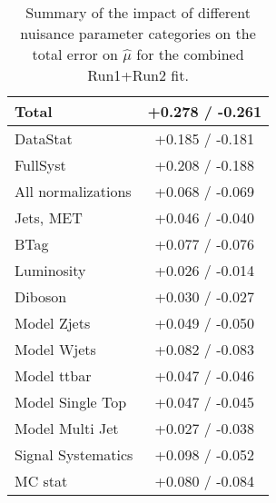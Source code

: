 \begin{table}[!htbp]\captionsetup{justification=centering}
\caption{Summary of the impact of different nuisance parameter categories on the total error on $\hat{\mu}$ for the combined Run1+Run2 fit.}
\begin{center}\begin{tabular}{|l|c|}
\hline
Total & +0.278 / -0.261 \\\hline
DataStat & +0.185 / -0.181 \\
FullSyst & +0.208 / -0.188 \\\hline
All normalizations & +0.068 / -0.069 \\
Jets, MET & +0.046 / -0.040 \\
BTag & +0.077 / -0.076 \\
Luminosity & +0.026 / -0.014 \\
Diboson &  +0.030 / -0.027 \\
Model Zjets & +0.049 / -0.050 \\
Model Wjets & +0.082 / -0.083 \\
Model ttbar & +0.047 / -0.046 \\
Model Single Top & +0.047 / -0.045 \\
Model Multi Jet & +0.027 / -0.038 \\
Signal Systematics & +0.098 / -0.052 \\
MC stat & +0.080 / -0.084 \\
\hline
\end{tabular}
\label{tab:combbreakdown}
\end{center}
\end{table}


